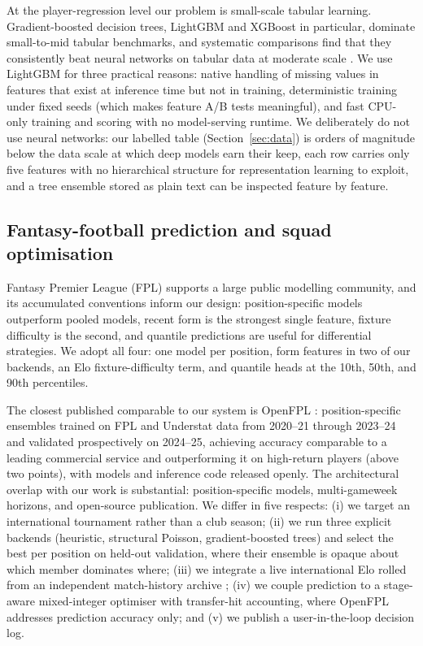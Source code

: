At the player-regression level our problem is small-scale tabular
learning. Gradient-boosted decision trees, LightGBM
\citep{ke2017lightgbm} and XGBoost \citep{chen2016xgboost} in
particular, dominate small-to-mid tabular benchmarks, and systematic
comparisons find that they consistently beat neural networks on
tabular data at moderate scale \citep{borisov2022deeptabular,
shwartz2022tabular}. We use LightGBM for three practical reasons:
native handling of missing values in features that exist at inference
time but not in training, deterministic training under fixed seeds
(which makes feature A/B tests meaningful), and fast CPU-only
training and scoring with no model-serving runtime. We deliberately
do not use neural networks: our labelled table
(Section~\ref{sec:data}) is orders of magnitude below the data scale
at which deep models earn their keep, each row carries only five
features with no hierarchical structure for representation learning
to exploit, and a tree ensemble stored as plain text can be inspected
feature by feature.

\subsection{Fantasy-football prediction and squad optimisation}
\label{sec:related-fantasy}

Fantasy Premier League (FPL) supports a large public modelling
community, and its accumulated conventions inform our design:
position-specific models outperform pooled models, recent form is the
strongest single feature, fixture difficulty is the second, and
quantile predictions are useful for differential strategies. We adopt
all four: one model per position, form features in two of our
backends, an Elo fixture-difficulty term, and quantile heads at the
10th, 50th, and 90th percentiles.

The closest published comparable to our system is OpenFPL
\citep{groos2025openfpl}: position-specific ensembles trained on FPL
and Understat data from 2020--21 through 2023--24 and validated
prospectively on 2024--25, achieving accuracy comparable to a leading
commercial service and outperforming it on high-return players (above
two points), with models and inference code released openly. The
architectural overlap with our work is substantial: position-specific
models, multi-gameweek horizons, and open-source publication. We
differ in five respects: (i) we target an international tournament
rather than a club season; (ii) we run three explicit backends
(heuristic, structural Poisson, gradient-boosted trees) and select
the best per position on held-out validation, where their ensemble is
opaque about which member dominates where; (iii) we integrate a live
international Elo rolled from an independent match-history archive
\citep{martj42}; (iv) we couple prediction to a stage-aware
mixed-integer optimiser with transfer-hit accounting, where OpenFPL
addresses prediction accuracy only; and (v) we publish a
user-in-the-loop decision log.

